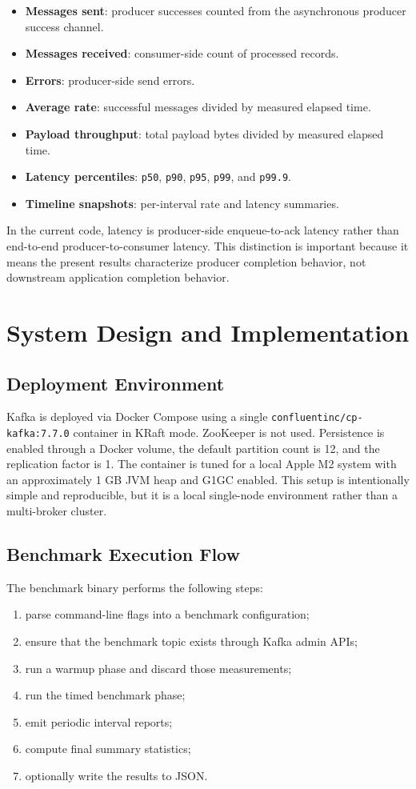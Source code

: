 \documentclass[conference]{IEEEtran}
\begin{document}
\begin{itemize}
\item \textbf{Messages sent}: producer successes counted from the asynchronous producer success channel.
\item \textbf{Messages received}: consumer-side count of processed records.
\item \textbf{Errors}: producer-side send errors.
\item \textbf{Average rate}: successful messages divided by measured elapsed time.
\item \textbf{Payload throughput}: total payload bytes divided by measured elapsed time.
\item \textbf{Latency percentiles}: \texttt{p50}, \texttt{p90}, \texttt{p95}, \texttt{p99}, and \texttt{p99.9}.
\item \textbf{Timeline snapshots}: per-interval rate and latency summaries.
\end{itemize}

In the current code, latency is producer-side enqueue-to-ack latency rather than end-to-end producer-to-consumer latency. This distinction is important because it means the present results characterize producer completion behavior, not downstream application completion behavior.

\section{System Design and Implementation}
\subsection{Deployment Environment}
Kafka is deployed via Docker Compose using a single \texttt{confluentinc/cp-kafka:7.7.0} container in KRaft mode. ZooKeeper is not used. Persistence is enabled through a Docker volume, the default partition count is 12, and the replication factor is 1. The container is tuned for a local Apple M2 system with an approximately 1 GB JVM heap and G1GC enabled. This setup is intentionally simple and reproducible, but it is a local single-node environment rather than a multi-broker cluster.

\subsection{Benchmark Execution Flow}
The benchmark binary performs the following steps:

\begin{enumerate}
\item parse command-line flags into a benchmark configuration;
\item ensure that the benchmark topic exists through Kafka admin APIs;
\item run a warmup phase and discard those measurements;
\item run the timed benchmark phase;
\item emit periodic interval reports;
\item compute final summary statistics;
\item optionally write the results to JSON.
\end{enumerate}
\end{document}
